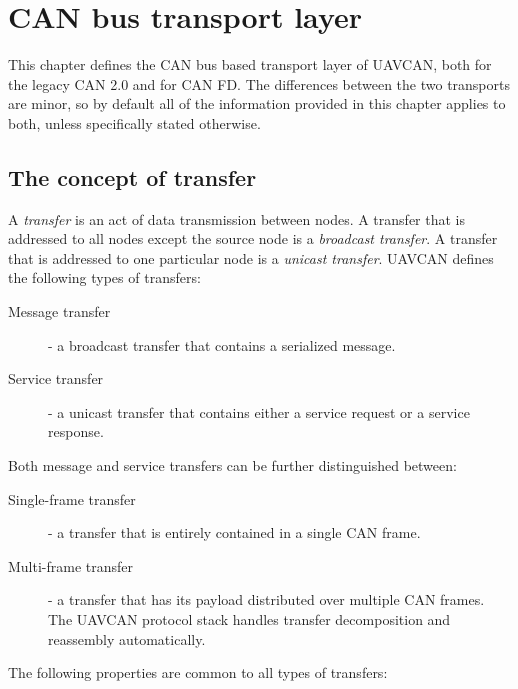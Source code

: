 \chapter{CAN bus transport layer}\label{sec:can_bus_transport_layer}

This chapter defines the CAN bus based transport layer of UAVCAN,
both for the legacy CAN 2.0 and for CAN FD.
The differences between the two transports are minor,
so by default all of the information provided in this chapter applies to both,
unless specifically stated otherwise.

\section{The concept of transfer}

A \emph{transfer} is an act of data transmission between nodes.
A transfer that is addressed to all nodes except the source node is a \emph{broadcast transfer}.
A transfer that is addressed to one particular node is a \emph{unicast transfer}.
UAVCAN defines the following types of transfers:

\begin{description}
    \item[Message transfer] - a broadcast transfer that contains a serialized message.
    \item[Service transfer] - a unicast transfer that contains either a service request or a service response.
\end{description}

Both message and service transfers can be further distinguished between:

\begin{description}
    \item[Single-frame transfer] - a transfer that is entirely contained in a single CAN frame.
    \item[Multi-frame transfer] - a transfer that has its payload distributed over multiple CAN frames.
    The UAVCAN protocol stack handles transfer decomposition and reassembly automatically.
\end{description}

The following properties are common to all types of transfers:

